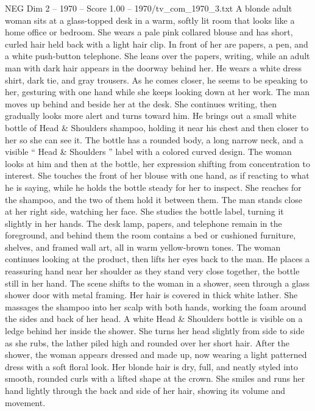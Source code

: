 \begin{textsample}{NEG Dim 2 – 1970 – Score 1.00 – 1970/tv\_com\_1970\_3.txt}  \label{ex:f2_neg_030}
A blonde adult woman sits at a glass-topped desk in a warm, softly lit room that looks like a home office or bedroom.
She wears a pale pink collared blouse and has short, curled hair held back with a light hair clip.
In front of her are papers, a pen, and a white push-button telephone.
She leans over the papers, writing, while an adult man with dark hair appears in the doorway behind her.
He wears a white dress shirt, dark tie, and gray trousers.
As he comes closer, he seems to be speaking to her, gesturing with one hand while she keeps looking down at her work.
The man moves up behind and beside her at the desk.
She continues writing, then gradually looks more alert and turns toward him.
He brings out a small white bottle of Head \& Shoulders shampoo, holding it near his chest and then closer to her so she can see it.
The bottle has a rounded body, a long narrow neck, and a visible “ Head \& Shoulders ” label with a colored curved design.
The woman looks at him and then at the bottle, her expression shifting from concentration to interest.
She touches the front of her blouse with one hand, as if reacting to what he is saying, while he holds the bottle steady for her to inspect.
She reaches for the shampoo, and the two of them hold it between them.
The man stands close at her right side, watching her face.
She studies the bottle label, turning it slightly in her hands.
The desk lamp, papers, and telephone remain in the foreground, and behind them the room contains a bed or cushioned furniture, shelves, and framed wall art, all in warm yellow-brown tones.
The woman continues looking at the product, then lifts her eyes back to the man.
He places a reassuring hand near her shoulder as they stand very close together, the bottle still in her hand.
The scene shifts to the woman in a shower, seen through a glass shower door with metal framing.
Her hair is covered in thick white lather.
She massages the shampoo into her scalp with both hands, working the foam around the sides and back of her head.
A white Head \& Shoulders bottle is visible on a ledge behind her inside the shower.
She turns her head slightly from side to side as she rubs, the lather piled high and rounded over her short hair.
After the shower, the woman appears dressed and made up, now wearing a light patterned dress with a soft floral look.
Her blonde hair is dry, full, and neatly styled into smooth, rounded curls with a lifted shape at the crown.
She smiles and runs her hand lightly through the back and side of her hair, showing its volume and movement.

\end{textsample}
